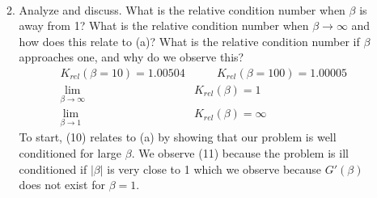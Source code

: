 \documentclass[10pt]{article}
\begin{document}
\begin{enumerate}
\begin{enumerate}[label=(\alph*)]
\begin{align}
			\end{align}
		\item Analyze and discuss. What is the relative condition number when $\beta$ is away from 1? What is the relative condition number when $\beta \rightarrow \infty$ and how does this relate to (a)? What is the relative condition number if $\beta$ approaches one, and why do we observe this?
			\begin{align}
				K_{rel}(\beta = 10) = 1.00504 &\qquad K_{rel}(\beta = 100) = 1.00005 \nonumber \\
				\lim_{\beta \to \infty}&K_{rel}(\beta) = 1 \\
				\lim_{\beta \to 1}&K_{rel}(\beta) = \infty
			\end{align}
			To start, (10) relates to (a) by showing that our problem is well conditioned for large $\beta$. We observe (11) because the problem is ill conditioned if $|\beta|$ is very close to 1 which we observe because $G'(\beta)$ does not exist for $\beta=1$.
	\end{enumerate}
	\pagebreak



\end{enumerate}
\end{document}
